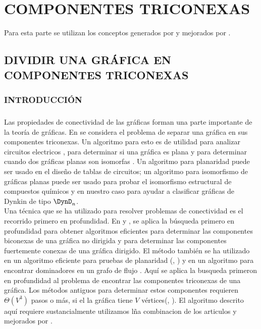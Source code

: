 \chapter{COMPONENTES TRICONEXAS}

Para esta parte se utilizan los conceptos generados por \citep{hopcroft1973} y mejorados por \citep{Gutwenger2000ALT}.

\section{DIVIDIR UNA GRÁFICA EN COMPONENTES TRICONEXAS}

\subsection{INTRODUCCIÓN}

\paragraph{}
Las propiedades de conectividad de las gráficas forman una parte importante de la teoría de gráficas. En \citep{hopcroft1973} se considera el problema de separar una gráfica en sus componentes triconexas. Un algoritmo para esto es de utilidad para analizar circuitos electricos \citep{1083313} , para determinar si una gráfica es plana \citep{10893101} y para determinar cuando dos gráficas planas son isomorfas \citep{Hopcroft1972}. Un algoritmo para planaridad puede ser usado en el diseño de tablas de circuitos; un algoritmo para isomorfismo de gráficas planas puede ser usado para probar el isomorfismo estructural de compuestos químicos \citep{Lederberg1964DENDRAL64AS} y en nuestro caso para ayudar a clasificar gráficas de Dynkin de tipo $\DynD_{n}$.\\

Una técnica que se ha utilizado para resolver problemas de conectividad es el recorrido primero en profundidad. En \citep{4569669} y \citep{efalgm}, se aplica la búsqueda primero en profundidad para obtener algoritmos eficientes para determinar las componentes biconexas de una gráfica no dirigida y para determinar las componentes fuertemente conexas de una gráfica dirigido. El método también se ha utilizado en un algoritmo eficiente para pruebas de planaridad (\citep{tarjan1971efficient}, \citep{ept}) y en un algoritmo para encontrar dominadores en un grafo de flujo \citep{Tarjan1974FindingDI}. Aquí se aplica la busqueda primeron en profundidad al problema de encontrar las componentes triconexas de una gráfica. Los métodos antiguos para determinar estos componentes requieren $\Theta\left(V^{3}\right)$ pasos o más, si el la gráfica tiene $V$ vértices(\citep{1083313}, \cite{1082941}). El algoritmo descrito aquí requiere sustancialmente utilizamos lña combinacion de los articulos \citep{hopcroft1973} y mejorados por \citep{Gutwenger2000ALT}.\\

